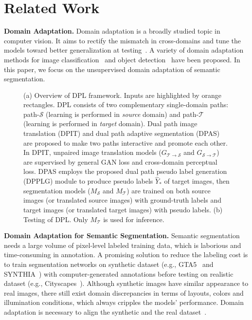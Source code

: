 \documentclass[10pt,twocolumn,letterpaper]{article}
\begin{document}
\section{Related Work}
{\noindent \textbf{Domain Adaptation.}}\hspace{3pt}
Domain adaptation is a broadly studied topic in computer vision. It aims to rectify the mismatch in cross-domains and tune the models toward better generalization at testing~\cite{patel2015visual}. A variety of domain adaptation methods for image classification~\cite{saito2017maximum,Chen_2019_CVPR,tzeng2017adversarial,kang2019contrastive} and object detection~\cite{chen2018domain,bhattacharjee2020dunit} have been proposed. In this paper, we focus on the unsupervised domain adaptation of semantic segmentation.

\begin{figure*}[t]
    \centering 
    \hspace{0.2cm}
\caption{(a) Overview of DPL framework. Inputs are highlighted by orange rectangles. DPL consists of two complementary single-domain paths: path-$\mathcal{S}$ (learning is performed in \emph{source} domain) and path-$\mathcal{T}$ (learning is performed in \emph{target} domain). Dual path image translation (DPIT) and dual path adaptive segmentation (DPAS) are proposed to make two paths interactive and promote each other. In DPIT, unpaired image translation models ($G_{\mathcal{T}\rightarrow\mathcal{S}}$ and $G_{\mathcal{S}\rightarrow\mathcal{T}}$) are supervised by general GAN loss and cross-domain perceptual loss. DPAS employs the proposed dual path pseudo label generation (DPPLG) module to produce pseudo labels $\hat{Y}_{*}$ of target images, then segmentation models ($M_{\mathcal{S}}$ and $M_{\mathcal{T}}$) are trained on both source images (or translated source images) with ground-truth labels and target images (or translated target images) with pseudo labels. (b) Testing of DPL. Only $M_{\mathcal{T}}$ is used for inference.}
    \label{fig:DPL_flowchat}
    \vspace{-0.5cm}
\end{figure*}

{\noindent \textbf{Domain Adaptation for Semantic Segmentation.}}\hspace{3pt}
Semantic segmentation needs a large volume of pixel-level labeled training data, which is laborious and time-consuming in annotation. A promising solution to reduce the labeling cost is to train segmentation networks on synthetic dataset (e.g., GTA5~\cite{richter2016playing} and SYNTHIA~\cite{ros2016synthia}) with computer-generated annotations before testing on realistic dataset (e.g., Cityscapes~\cite{cordts2016cityscapes}). Although synthetic images have similar appearance to real images, there still exist domain discrepancies in terms of layouts, colors and illumination conditions, which always cripples the models' performance. Domain adaptation is necessary to align the synthetic and the real dataset~\cite{wu2018dcan,zou2018unsupervised,zhao2019madan,kang2020pixel}. 
\end{document}
